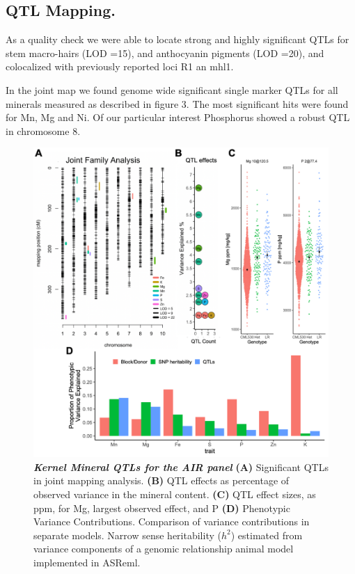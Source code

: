 \subsection{QTL Mapping.}
As a quality check we were able to locate strong and highly significant QTLs for stem macro-hairs (LOD =15), and anthocyanin pigments (LOD =20), and colocalized with previously reported loci R1 an mhl1.

In the joint map we found genome wide significant single marker QTLs for all minerals measured as described in figure 3. The most significant hits were found for Mn, Mg and Ni.  Of our particular interest Phosphorus showed a robust QTL in chromosome 8.






\begin{figure}[!ht]
\includegraphics[width=\linewidth]{Chapter-4/figs/mineral_qtls.png}
\caption[Kernel Mineral QTLs for the AIR panel]{\textit{\textbf{Kernel Mineral QTLs for the AIR panel}}
\textbf{(A)} Significant QTLs in joint mapping analysis.
\textbf{(B)} QTL effects as percentage of observed variance in the mineral content. \textbf{(C)} QTL effect sizes, as ppm, for Mg, largest observed effect, and P
\textbf{(D)}  Phenotypic Variance Contributions. Comparison of variance contributions in separate models. Narrow sense heritability ($h^2$) estimated from variance components of a genomic relationship animal model implemented in ASReml.
}
\label{fig:mineralQTL}
\end{figure}
\clearpage

